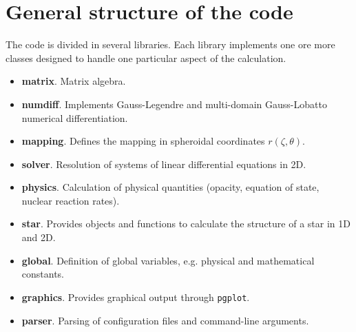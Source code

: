 \chapter{General structure of the code}

The code is divided in several libraries. Each library implements one ore more classes designed to
handle one particular aspect of the calculation. 

\begin{itemize}
\item {\bf matrix}. Matrix algebra.
\item {\bf numdiff}. Implements Gauss-Legendre and multi-domain Gauss-Lobatto
numerical differentiation.
\item {\bf mapping}. Defines the mapping in spheroidal coordinates $r(\zeta,\theta)$. 
\item {\bf solver}. Resolution of systems of linear differential equations in 2D.
\item {\bf physics}. Calculation of physical quantities (opacity, equation of state, nuclear reaction rates).
\item {\bf star}. Provides objects and functions to calculate the structure of a star in 1D and 2D.
\item {\bf global}. Definition of global variables, e.g. physical and mathematical constants.
\item {\bf graphics}. Provides graphical output through {\tt pgplot}.
\item {\bf parser}. Parsing of configuration files and command-line arguments.
\end{itemize} 


